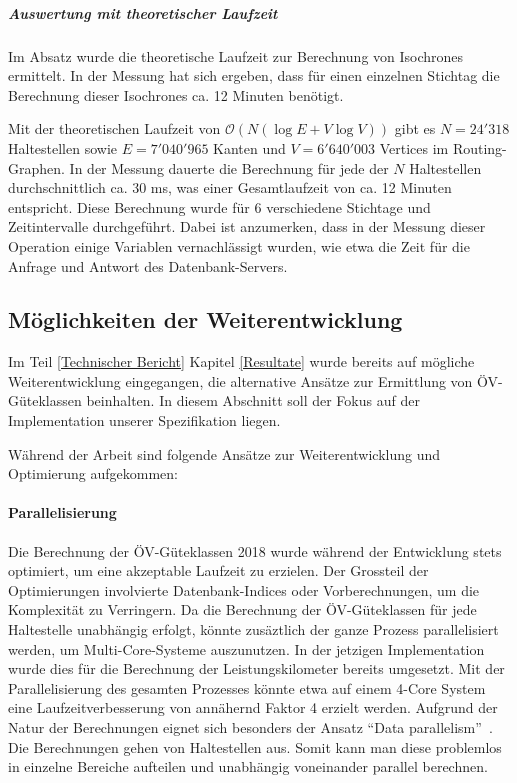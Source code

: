 \subparagraph{Auswertung mit theoretischer Laufzeit}
Im Absatz  wurde die theoretische Laufzeit zur Berechnung von \glspl{Isochrone} ermittelt.
In der Messung hat sich ergeben, dass für einen einzelnen Stichtag die Berechnung dieser \glspl{Isochrone} ca. 12 Minuten benötigt.

Mit der theoretischen Laufzeit von $\mathcal{O}(N (\log E + V \log V))$ gibt es $N = 24'318$ Haltestellen sowie $E = 7'040'965$ Kanten und $V = 6'640'003$ Vertices im Routing-Graphen.
In der Messung dauerte die Berechnung für jede der $N$ Haltestellen durchschnittlich ca. 30 ms, was einer Gesamtlaufzeit von ca. 12 Minuten entspricht.
Diese Berechnung wurde für 6 verschiedene Stichtage und Zeitintervalle durchgeführt.
Dabei ist anzumerken, dass in der Messung dieser Operation einige Variablen vernachlässigt wurden, wie etwa die Zeit für die Anfrage und Antwort des Datenbank-Servers.

\subsection{Möglichkeiten der Weiterentwicklung}
\label{Resultate und Weiterentwicklung:Möglichkeiten der Weiterentwicklung}

Im Teil \ref{Technischer Bericht} Kapitel \ref{Resultate} wurde bereits auf mögliche Weiterentwicklung eingegangen, die alternative Ansätze zur Ermittlung von \acs{ÖV}-Güteklassen beinhalten.
In diesem Abschnitt soll der Fokus auf der Implementation unserer Spezifikation liegen.

Während der Arbeit sind folgende Ansätze zur Weiterentwicklung und Optimierung aufgekommen:

\paragraph{Parallelisierung}
Die Berechnung der \acs{ÖV}-Güteklassen 2018 wurde während der Entwicklung stets optimiert, um eine akzeptable Laufzeit zu erzielen.
Der Grossteil der Optimierungen involvierte Datenbank-Indices oder Vorberechnungen, um die Komplexität zu Verringern.
Da die Berechnung der \acs{ÖV}-Güteklassen für jede Haltestelle unabhängig erfolgt, könnte zusäztlich der ganze Prozess parallelisiert werden, um Multi-Core-Systeme auszunutzen.
In der jetzigen Implementation wurde dies für die Berechnung der Leistungskilometer bereits umgesetzt.
Mit der Parallelisierung des gesamten Prozesses könnte etwa auf einem 4-Core System eine Laufzeitverbesserung von annähernd Faktor 4 erzielt werden.
Aufgrund der Natur der Berechnungen eignet sich besonders der Ansatz "`Data parallelism"'~\cite{parallel_comp}.
Die Berechnungen gehen von Haltestellen aus.
Somit kann man diese problemlos in einzelne Bereiche aufteilen und unabhängig voneinander parallel berechnen.

